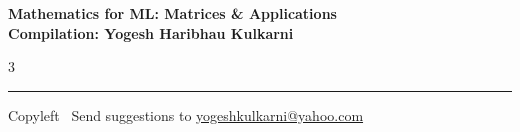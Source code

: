 \documentclass[8pt,landscape]{article}
\begin{document}
\footnotesize


\begin{center}
\Large{\textbf{Mathematics for ML: Matrices \& Applications\\ Compilation: Yogesh Haribhau Kulkarni}}
\end{center}

\begin{multicols}{3}

\end{multicols}

\rule{\linewidth}{0.25pt}
\scriptsize
Copyleft \textcopyleft\  Send suggestions to
\href{http://www.yogeshkulkarni.com}{yogeshkulkarni@yahoo.com}
\end{document}
